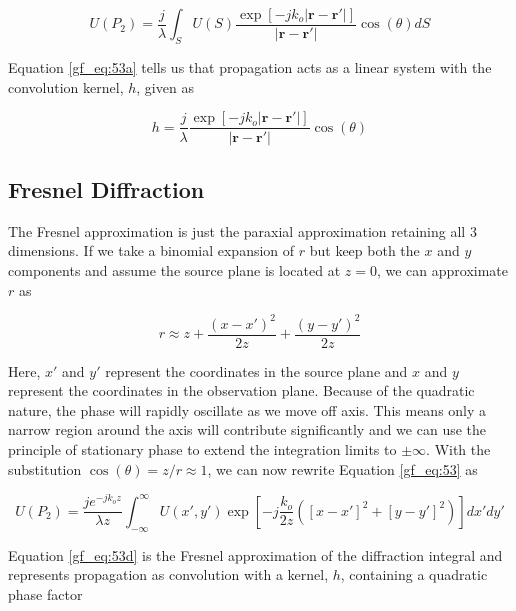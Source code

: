 \begin{equation}
U(P_2) =\frac{j}{\lambda}\int_S U(S)\frac{\exp\left[-jk_o |\mathbf{r}-\mathbf{r}'|\right]}{|\mathbf{r}-\mathbf{r}'|}\cos(\theta)dS
\label{gf_eq:53a}
\end{equation}
\renewcommand{\baselinestretch}{2} \small\normalsize

Equation \ref{gf_eq:53a} tells us that propagation acts as a linear system with the convolution kernel, $h$, given as

\begin{equation}
h=\frac{j}{\lambda}\frac{\exp\left[-jk_o |\mathbf{r}-\mathbf{r}'|\right]}{|\mathbf{r}-\mathbf{r}'|}\cos(\theta)
\label{gf_eq:53b}
\end{equation}
\renewcommand{\baselinestretch}{2} \small\normalsize

\subsection{Fresnel Diffraction}
The Fresnel approximation is just the paraxial approximation retaining all 3 dimensions. If we take a binomial expansion of $r$ but keep both the $x$ and $y$ components and assume the source plane is located at $z=0$, we can approximate $r$ as

\begin{equation}
r\approx z + \frac{(x-x')^2}{2z}+\frac{(y-y')^2}{2z}
\label{gf_eq:53c}
\end{equation}
\renewcommand{\baselinestretch}{2} \small\normalsize

Here, $x'$ and $y'$ represent the coordinates in the source plane and $x$ and $y$ represent the coordinates in the observation plane. Because of the quadratic nature, the phase will rapidly oscillate as we move off axis. This means only a narrow region around the axis will contribute significantly and we can use the principle of stationary phase \cite{gbur_math} to extend the integration limits to $\pm \infty$. With the substitution $\cos(\theta) = z/r \approx 1$, we can now rewrite Equation \ref{gf_eq:53} as

\begin{equation}
\boxed{U(P_2) =\frac{je^{-jk_oz}}{\lambda z}\int_{-\infty}^{\infty} U(x',y')\exp\left[-j \frac{k_o}{2z}\left([x-x']^2 + [y-y']^2 \right) \right]dx' dy'}
\label{gf_eq:53d}
\end{equation}
\renewcommand{\baselinestretch}{2} \small\normalsize

Equation \ref{gf_eq:53d} is the Fresnel approximation of the diffraction integral and represents propagation as convolution with a kernel, $h$, containing a quadratic phase factor

